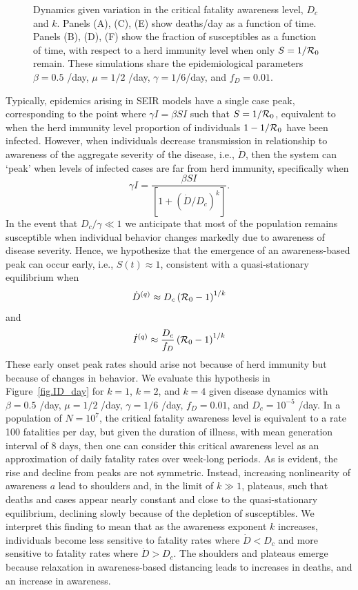 \begin{figure}[t!]
\begin{center}
\caption{Dynamics given variation in the critical fatality awareness
level, $D_c$ and $k$. Panels (A), (C), (E) show deaths/day as a 
function of time. Panels (B), (D), (F) show the fraction of 
susceptibles as a function of time, with respect to a herd immunity
level when only $S=1/{\cal{R}}_0$ remain.
These simulations share the
epidemiological parameters 
$\beta=0.5$ /day, $\mu=1/2$ /day, $\gamma=1/6$/day,
and $f_D=0.01$.
\label{fig.generic}}
\end{center}
\end{figure}

Typically, epidemics arising in SEIR models have a single case peak, corresponding 
to the point where $\gamma I = \beta S I $ such that 
$S=1/{\cal{R}}_0$, equivalent to when the herd
immunity level proportion of individuals
$1-1/{\cal{R}}_0$ have been infected.
However, when individuals decrease transmission in relationship
to awareness of the aggregate severity of the disease, i.e., $\dot{D}$, 
then the system can `peak' when levels of infected cases are
far from herd immunity, specifically when
\begin{equation}
\gamma I = \frac{\beta SI}{\left[1+\left(\dot{D}/D_c\right)^{k}\right]}.
\end{equation}
In the event that $D_c/\gamma \ll 1$ we anticipate that most of the population
remains susceptible when individual behavior changes markedly
due to awareness of disease severity. Hence, we hypothesize that the
emergence of an
awareness-based peak can occur early, i.e., $S(t)\approx 1$, consistent
with a quasi-stationary equilibrium when
\begin{equation}
\dot{D}^{(q)} \approx D_c\left({\cal{R}}_0-1\right)^{1/k}
\end{equation}
and
\begin{equation}
\dot{I}^{(q)} \approx \frac{D_c}{f_D}\left({\cal{R}}_0-1\right)^{1/k}
\end{equation}
These early onset peak rates should arise not because
of herd immunity but because of changes in behavior. 
We evaluate this hypothesis in
Figure~\ref{fig.ID_day} for $k=1$, $k=2$, and $k=4$
given disease dynamics with $\beta=0.5$ /day, $\mu=1/2$ /day, $\gamma=1/6$
/day,
$f_D=0.01$, and $D_c=10^{-5}$ /day.  In a population of $N=10^7$, the
critical fatality awareness level is equivalent to a rate 100 fatalities
per day, but given the duration of illness, with mean generation
interval of 8 days, then one can consider this critical awareness
level as an approximation of daily fatality rates over week-long periods.
As is evident, the rise and decline from peaks are not symmetric. Instead,
increasing nonlinearity of awareness
$a$ lead to shoulders and, in the limit of $k\gg 1$, plateaus, such that
deaths and cases appear nearly constant and close to the quasi-stationary
equilibrium, declining slowly because of the
depletion of susceptibles.  
We interpret this finding to mean that as the awareness exponent $k$ increases,
individuals become less sensitive to fatality rates
where $\dot{D} < D_c$ and more sensitive to fatality rates where $\dot{D} > D_c$.  
The shoulders and plateaus emerge because relaxation in awareness-based
distancing leads to increases in deaths, and an increase in awareness.

